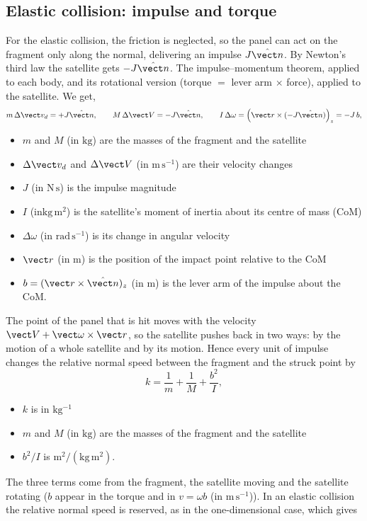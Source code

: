 \subsection{Elastic collision: impulse and torque}

For the elastic collision, the friction is neglected, so the panel can act on the fragment only along the normal, 
delivering an impulse $J\hat{\vect n}$. By Newton's
third law the satellite gets $-J\hat{\vect n}$. The impulse–momentum theorem, applied to each body, and its rotational version 
(torque $=$ lever arm $\times$ force), applied to the satellite. We get,
\begin{equation}
  m\,\Delta\vect v_d = +J\hat{\vect n},\qquad
  M\,\Delta\vect V = -J\hat{\vect n},\qquad
  I\,\Delta\omega = \left(\vect r\times(-J\hat{\vect n})\right)_z = -J\,b,
  \label{eq:impulse}
\end{equation}
\begin{itemize}
  \item $m$ and $M$ (in $\mathrm{kg}$) are the masses of the fragment and the
satellite
\item $\Delta\vect v_d$ and $\Delta\vect V$ (in $\mathrm{m\,s^{-1}}$) are
their velocity changes
\item $J$ (in $\mathrm{N\,s}$) is the impulse magnitude
\item $I$ (in$\mathrm{kg\,m^{2}}$) is the satellite's moment of inertia about its centre of
mass (CoM)
\item $\Delta\omega$ (in $\mathrm{rad\,s^{-1}}$) is its change in angular
velocity
\item $\vect r$ (in $\mathrm{m}$) is the position of the impact point
relative to the CoM
\item $b=(\vect r\times\hat{\vect n})_z$ (in $\mathrm{m}$) is
the lever arm of the impulse about the CoM. 
\end{itemize}
The point of the panel that is hit moves with
the velocity $\vect V+\vect\omega\times\vect r$, so the satellite pushes back 
in two ways: by the motion of a whole satellite and by its motion. Hence every unit of
impulse changes the relative normal speed between the fragment and the struck
point by
\begin{equation}
  k = \frac{1}{m}+\frac{1}{M}+\frac{b^{2}}{I},
  \label{eq:k}
\end{equation}
\begin{itemize}
  \item $k$ is in $\mathrm{kg^{-1}}$
  \item $m$ and $M$ (in $\mathrm{kg}$) are the masses of the fragment and the
satellite
  \item $b^2/I$ is $\mathrm{m^2/(kg\,m^2)}$.
\end{itemize}
 The three terms come from the
fragment, the satellite moving and the satellite rotating ($b$ appear in the torque and in $v=\omega b$ (in $\mathrm{m\,s^{-1}}$)). In an elastic collision the
relative normal speed is reserved, as in the one-dimensional case,
which gives


